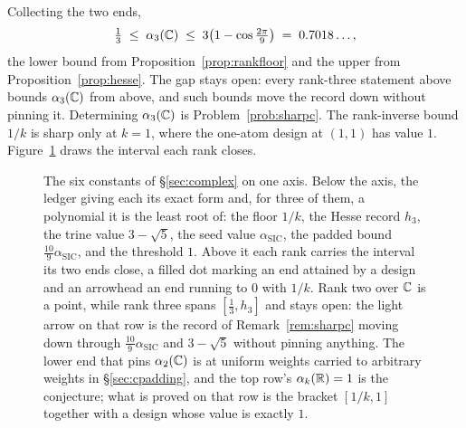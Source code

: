 \begin{remark}\label{rem:sharpc}
Collecting the two ends,
\[
  \tfrac13\;\le\;\alpha_3(\mathbb{C})\;\le\;3\bigl(1-\cos\tfrac{2\pi}{9}\bigr)
  \;=\;0.7018\ldots,
\]
the lower bound from Proposition~\ref{prop:rankfloor} and the upper from
Proposition~\ref{prop:hesse}.  The gap stays open: every rank-three
statement above bounds $\alpha_3(\mathbb{C})$ from above, and such bounds move
the record down without pinning it.  Determining $\alpha_3(\mathbb{C})$ is
Problem~\ref{prob:sharpc}.  The rank-inverse bound $1/k$ is sharp only at
$k=1$, where the one-atom design at $(1,1)$ has value $1$.
Figure~\ref{fig:constants} draws the interval each rank closes.
\end{remark}

\begin{figure}[ht]
  \centering
  
  \caption{The six constants of \S\ref{sec:complex} on one axis.  Below the
  axis, the ledger giving each its exact form and, for three of them, a
  polynomial it is the least root of: the floor
  $1/k$, the Hesse record $h_3$, the trine value $3-\sqrt5$, the seed value
  $\alpha_{\mathrm{SIC}}$, the padded bound
  $\tfrac{10}9\alpha_{\mathrm{SIC}}$, and the threshold $1$.  Above it each
  rank carries the interval its two ends close, a filled dot marking an end
  attained by a design and an arrowhead an end running to $0$ with $1/k$.
  Rank two over $\mathbb{C}$
  is a point, while rank three spans $[\tfrac13,h_3]$ and stays open: the light
  arrow on that row is the record of Remark~\ref{rem:sharpc} moving down
  through $\tfrac{10}9\alpha_{\mathrm{SIC}}$ and $3-\sqrt5$ without pinning
  anything.  The lower end that pins $\alpha_2(\mathbb{C})$ is
  \cite{Nesterenko2026complex} at uniform weights carried to arbitrary weights
  in \S\ref{sec:cpadding}, and the top row's $\alpha_k(\mathbb{R})=1$ is the
  conjecture; what is proved on that row is the bracket $[1/k,1]$ together with
  a design whose value is exactly $1$.}
  \label{fig:constants}
\end{figure}
